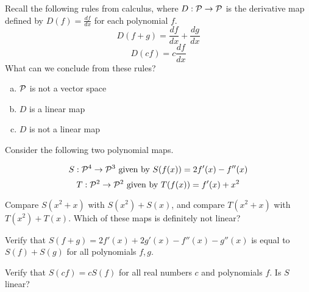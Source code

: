 \begin{applicationActivities}
\begin{activity}{3}
  Recall the following rules from calculus, where \(D:\P\to\P\)
  is the derivative map defined by \(D(f)=\frac{df}{dx}\) for each
  polynomial \(f\).
  \[
    D(f+g)=\frac{df}{dx}+\frac{dg}{dx}
  \]
  \[
    D(cf)=c\frac{df}{dx}
  \]
  What can we conclude from these rules?
  \begin{enumerate}[a)]
    \item \(\P\) is not a vector space
    \item \(D\) is a linear map
    \item \(D\) is not a linear map
  \end{enumerate}
\end{activity}


\begin{activity}{12}
Consider the following two polynomial maps.

\[S: \P^4 \rightarrow \P^3 \text{ given by } S(f(x)) = 2f'(x)-f''(x)\]
\[T: \P^2 \rightarrow \P^2 \text{ given by } T(f(x)) = f'(x)+x^2\]

\begin{subactivity}
  Compare \(S(x^2+x)\) with \(S(x^2)+S(x)\), and
  compare \(T(x^2+x)\) with \(T(x^2)+T(x)\). Which of these maps
  is definitely not linear?
\end{subactivity}
\begin{subactivity}
  Verify that \(S(f+g)=2f'(x)+2g'(x)-f''(x)-g''(x)\) is equal
  to \(S(f)+S(g)\) for all polynomials \(f,g\).
\end{subactivity}
\begin{subactivity}
  Verify that \(S(cf)=cS(f)\) for all real numbers \(c\) and polynomials \(f\).
  Is \(S\) linear?
\end{subactivity}
\end{activity}

\end{applicationActivities}

